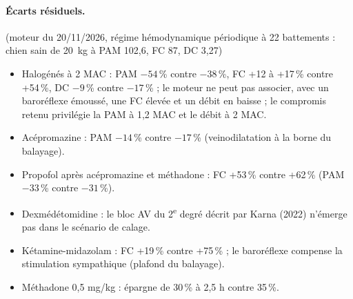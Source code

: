 \paragraph{Écarts résiduels.} (moteur du 20/11/2026, régime hémodynamique périodique à 22 battements : chien sain de \SI{20}{kg} à PAM 102,6, FC 87, DC 3,27)
\begin{itemize}
\item Halogénés à 2 MAC : PAM $-54$\,\% contre $-38$\,\%, FC +12 à +17\,\% contre +54\,\%, DC $-9$\,\% contre $-17$\,\% ; le moteur ne peut pas associer,
avec un baroréflexe émoussé, une FC élevée et un débit en baisse ; le compromis retenu privilégie la PAM à 1,2 MAC et le débit à 2 MAC.
\item Acépromazine : PAM $-14$\,\% contre $-17$\,\% (veinodilatation à la borne du balayage).
\item Propofol après acépromazine et méthadone : FC +53\,\% contre +62\,\% (PAM $-33$\,\% contre $-31$\,\%).
\item Dexmédétomidine : le bloc AV du 2\textsuperscript{e} degré décrit par Karna (2022) n'émerge pas dans le scénario de calage.
\item Kétamine-midazolam : FC +19\,\% contre +75\,\% ; le baroréflexe compense la stimulation sympathique (plafond du balayage).
\item Méthadone 0,5 mg/kg : épargne de 30\,\% à 2,5 h contre 35\,\%.
\end{itemize}
